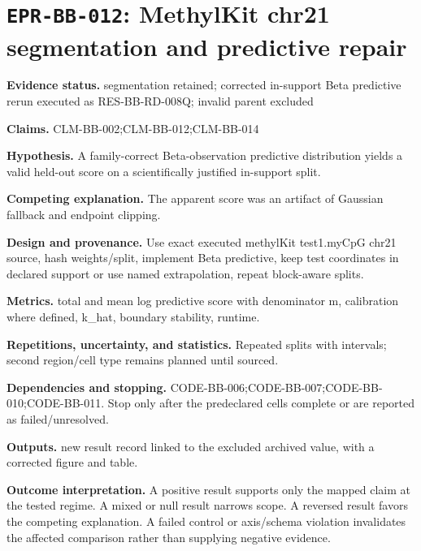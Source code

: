 \section[\texttt{EPR-BB-012}]{\texttt{EPR-BB-012}: MethylKit chr21 segmentation and predictive repair}
\textbf{Evidence status.} segmentation retained; corrected in-support Beta predictive rerun executed as RES-BB-RD-008Q; invalid parent excluded\par
\textbf{Claims.} CLM-BB-002;CLM-BB-012;CLM-BB-014\par
\textbf{Hypothesis.} A family-correct Beta-observation predictive distribution yields a valid held-out score on a scientifically justified in-support split.\par
\textbf{Competing explanation.} The apparent score was an artifact of Gaussian fallback and endpoint clipping.\par
\textbf{Design and provenance.} Use exact executed methylKit test1.myCpG chr21 source, hash weights/split, implement Beta predictive, keep test coordinates in declared support or use named extrapolation, repeat block-aware splits.\par
\textbf{Metrics.} total and mean log predictive score with denominator m, calibration where defined, k\_hat, boundary stability, runtime.\par
\textbf{Repetitions, uncertainty, and statistics.} Repeated splits with intervals; second region/cell type remains planned until sourced.\par
\textbf{Dependencies and stopping.} CODE-BB-006;CODE-BB-007;CODE-BB-010;CODE-BB-011. Stop only after the predeclared cells complete or are reported as failed/unresolved.\par
\textbf{Outputs.} new result record linked to the excluded archived value, with a corrected figure and table.\par
\textbf{Outcome interpretation.} A positive result supports only the mapped claim at the tested regime. A mixed or null result narrows scope. A reversed result favors the competing explanation. A failed control or axis/schema violation invalidates the affected comparison rather than supplying negative evidence.

